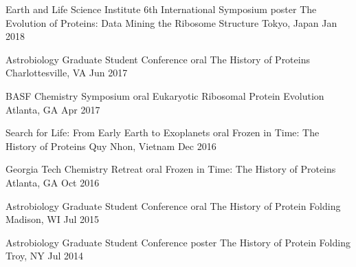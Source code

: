 

\begin{cventries}
\vspace{1mm}

  \cventry
    {Earth and Life Science Institute 6th International Symposium {\cdotp} poster} %
    {The Evolution of Proteins: Data Mining the Ribosome Structure} %
    {Tokyo, Japan} %
    {Jan 2018} %
    {}
    \vspace{-5.0mm}

  \cventry
    {Astrobiology Graduate Student Conference {\cdotp} oral} %
    {The History of Proteins} %
    {Charlottesville, VA} %
    {Jun 2017} %
    {}
    \vspace{-5.0mm}

  \cventry
    {BASF Chemistry Symposium {\cdotp} oral} %
    {Eukaryotic Ribosomal Protein Evolution} %
    {Atlanta, GA} %
    {Apr 2017} %
    {}
    \vspace{-5.0mm}

  \cventry
    {Search for Life: From Early Earth to Exoplanets {\cdotp} oral} %
    {Frozen in Time: The History of Proteins} %
    {Quy Nhon, Vietnam} %
    {Dec 2016} %
    {}
    \vspace{-5.0mm}

  \cventry
    {Georgia Tech Chemistry Retreat {\cdotp} oral} %
    {Frozen in Time: The History of Proteins} %
    {Atlanta, GA} %
    {Oct 2016} %
    {}
    \vspace{-5.0mm}

  \cventry
    {Astrobiology Graduate Student Conference {\cdotp} oral} %
    {The History of Protein Folding} %
    {Madison, WI} %
    {Jul 2015} %
    {}
    \vspace{-5.0mm}

  \cventry
    {Astrobiology Graduate Student Conference {\cdotp} poster} %
    {The History of Protein Folding} %
    {Troy, NY} %
    {Jul 2014} %
    {}
    \vspace{-8.0mm}

\end{cventries}
